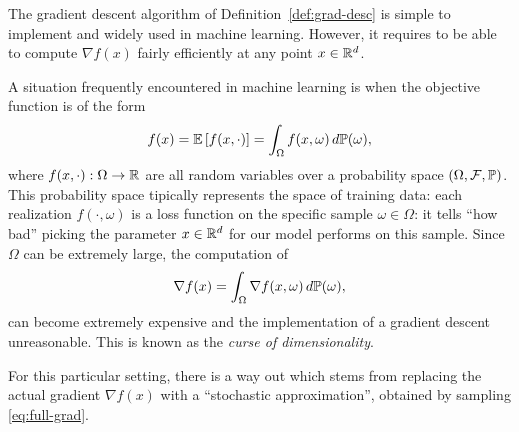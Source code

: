      The gradient descent algorithm of Definition~\ref{def:grad-desc} is simple to implement and widely used in machine learning. However, it requires to be able to compute $\nabla f(x)$ fairly efficiently at any point $x\in\mathbb{R}^d$.
 
     A situation frequently encountered in machine learning is when the objective function is of the form
     \begin{equation}
         \label{eq:loss}
         f(x) = \mathbb{E} \left[f(x,\cdot)\right] = \int_\Omega f(x,\omega)\, d\mathbb{P}(\omega),
     \end{equation}
     where $f(x,\cdot):\Omega\to \mathbb{R}$ are all random variables over a probability space $(\Omega,\mathcal{F}, \mathbb{P})$.
     This probability space tipically represents the space of training data: each realization $f(\cdot,\omega)$ is a loss function on the specific sample $\omega\in \Omega$: it tells ``how bad'' picking the parameter $x\in\mathbb{R}^d$ for our model performs on this sample.
     Since $\Omega$ can be extremely large,  the computation of
     \begin{equation}
         \label{eq:full-grad}
         \nabla f(x) = \int_{\Omega} \nabla f(x,\omega) \, d\mathbb{P}(\omega),
     \end{equation}
     can become extremely expensive and the implementation of a gradient descent unreasonable.
     This is known as the \emph{curse of dimensionality}.
 
 
     For this particular setting, there is a way out which stems from replacing the actual gradient $\nabla f(x)$ with a ``stochastic approximation'', obtained by sampling \eqref{eq:full-grad}.
 
